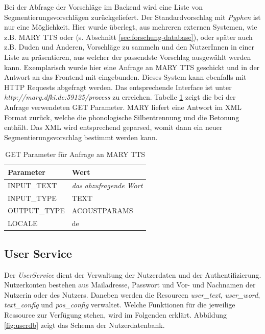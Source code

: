Bei der Abfrage der Vorschläge im Backend wird eine Liste von Segmentierungsvorschlägen zurückgeliefert. Der Standardvorschlag mit \textit{Pyphen} ist nur eine Möglichkeit. Hier wurde überlegt, aus mehreren externen Systemen, wie z.B. MARY TTS oder  (s. Abschnitt \ref{sec:forschung-database}), oder später auch z.B. Duden und Anderen, Vorschläge zu sammeln und den NutzerInnen in einer Liste zu präsentieren, aus welcher der passendste Vorschlag ausgewählt werden kann. Exemplarisch wurde hier eine Anfrage an MARY TTS geschickt und in der Antwort an das Frontend mit eingebunden. Dieses System kann ebenfalls mit HTTP Requests abgefragt werden. Das entsprechende Interface ist unter \textit{http://mary.dfki.de:59125/process} zu erreichen. Tabelle \ref{table:mary} zeigt die bei der Anfrage verwendeten GET Parameter. MARY liefert eine Antwort im XML Format zurück, welche die phonologische Silbentrennung und die Betonung enthält. Das XML wird entsprechend geparsed, womit dann ein neuer Segmentierungsvorschlag bestimmt werden kann.

\begin{table}[h!]
	\centering
	\begin{tabular}{|l|l|}
		\hline
		\textbf{Parameter} & \textbf{Wert}\\
		\hline
		\hline
		INPUT\_TEXT & \textit{das abzufragende Wort}\\
		INPUT\_TYPE & TEXT\\
		OUTPUT\_TYPE & ACOUSTPARAMS\\
		LOCALE & de\\
		\hline
	\end{tabular}
	\caption{GET Parameter für Anfrage an MARY TTS}
	\label{table:mary}
\end{table}

\subsection{User Service}
\label{sec:userservice}

Der \textit{UserService} dient der Verwaltung der Nutzerdaten und der Authentifizierung. Nutzerkonten bestehen aus Mailadresse, Passwort und Vor- und Nachnamen der Nutzerin oder des Nutzers. Daneben werden die Resourcen \textit{user\_text}, \textit{user\_word}, \textit{text\_config} und \textit{pos\_config} verwaltet. Welche Funktionen für die jeweilige Ressource zur Verfügung stehen, wird im Folgenden erklärt. Abbildung \ref{fig:userdb} zeigt das Schema der Nutzerdatenbank.

